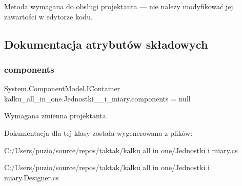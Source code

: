 Metoda wymagana do obsługi projektanta — nie należy modyfikować jej zawartości w edytorze kodu. 



\subsection{Dokumentacja atrybutów składowych}
\mbox{\label{classkalku__all__in__one_1_1_jednostki____i__miary_a7b1e52b4fd88b5cbd75f4e288e12291f}} 
\subsubsection{\texorpdfstring{components}{components}}
{\footnotesize\ttfamily System.\+Component\+Model.\+I\+Container kalku\+\_\+all\+\_\+in\+\_\+one.\+Jednostki\+\_\+\+\_\+i\+\_\+miary.\+components = null\hspace{0.3cm}{\ttfamily [private]}}



Wymagana zmienna projektanta. 



Dokumentacja dla tej klasy została wygenerowana z plików\+:\begin{DoxyCompactItemize}
\item 
C\+:/\+Users/puzio/source/repos/taktak/kalku all in one/Jednostki  i miary.\+cs\item 
C\+:/\+Users/puzio/source/repos/taktak/kalku all in one/Jednostki  i miary.\+Designer.\+cs\end{DoxyCompactItemize}
